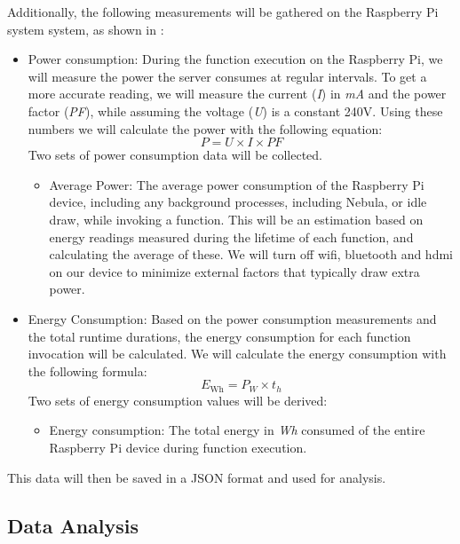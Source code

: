 \documentclass[
  table]{report}
\providecommand{\tightlist}{%
  \setlength{\itemsep}{0pt}\setlength{\parskip}{0pt}}
\begin{document}
Additionally, the following measurements will be gathered on the
Raspberry Pi system system, as shown in :

\begin{itemize}
\item
  Power consumption: During the function execution on the Raspberry Pi,
  we will measure the power the server consumes at regular intervals. To
  get a more accurate reading, we will measure the current (\emph{I}) in
  \emph{mA} and the power factor (\emph{PF}), while assuming the voltage
  (\emph{U}) is a constant 240V. Using these numbers we will calculate
  the power with the following equation: \[P = U \times I \times
  PF\] Two sets of power consumption data will be collected.

  \begin{itemize}
  \tightlist
  \item
    Average Power: The average power consumption of the Raspberry Pi
    device, including any background processes, including Nebula, or
    idle draw, while invoking a function. This will be an estimation
    based on energy readings measured during the lifetime of each
    function, and calculating the average of these. We will turn off
    wifi, bluetooth and hdmi on our device to minimize external factors
    that typically draw extra power.
  \end{itemize}
\item
  Energy Consumption: Based on the power consumption measurements and
  the total runtime durations, the energy consumption for each function
  invocation will be calculated. We will calculate the energy
  consumption with the following formula:
  \[E_{\text{Wh}} = P_W \times t_h\] Two sets of energy consumption
  values will be derived:

  \begin{itemize}
  \tightlist
  \item
    Energy consumption: The total energy in \emph{Wh} consumed of the
    entire Raspberry Pi device during function execution.
  \end{itemize}
\end{itemize}

This data will then be saved in a JSON format and used for analysis.

\subsection{Data Analysis}
\label{sect:data_anal}
\end{document}
